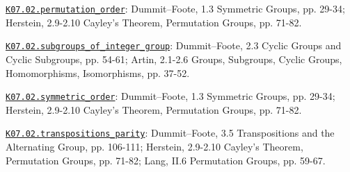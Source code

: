\par\smallskip\noindent\hypertarget{src:K07.02.permutation_order}{}\label{src:K07.02.permutation_order}\hyperref[K07.02.permutation_order]{\texttt{K07.02.permutation\_order}}: Dummit--Foote, 1.3 Symmetric Groups, pp. 29-34; Herstein, 2.9-2.10 Cayley's Theorem, Permutation Groups, pp. 71-82.
\par\smallskip\noindent\hypertarget{src:K07.02.subgroups_of_integer_group}{}\label{src:K07.02.subgroups_of_integer_group}\hyperref[K07.02.subgroups_of_integer_group]{\texttt{K07.02.subgroups\_of\_integer\_group}}: Dummit--Foote, 2.3 Cyclic Groups and Cyclic Subgroups, pp. 54-61; Artin, 2.1-2.6 Groups, Subgroups, Cyclic Groups, Homomorphisms, Isomorphisms, pp. 37-52.
\par\smallskip\noindent\hypertarget{src:K07.02.symmetric_order}{}\label{src:K07.02.symmetric_order}\hyperref[K07.02.symmetric_order]{\texttt{K07.02.symmetric\_order}}: Dummit--Foote, 1.3 Symmetric Groups, pp. 29-34; Herstein, 2.9-2.10 Cayley's Theorem, Permutation Groups, pp. 71-82.
\par\smallskip\noindent\hypertarget{src:K07.02.transpositions_parity}{}\label{src:K07.02.transpositions_parity}\hyperref[K07.02.transpositions_parity]{\texttt{K07.02.transpositions\_parity}}: Dummit--Foote, 3.5 Transpositions and the Alternating Group, pp. 106-111; Herstein, 2.9-2.10 Cayley's Theorem, Permutation Groups, pp. 71-82; Lang, II.6 Permutation Groups, pp. 59-67.
